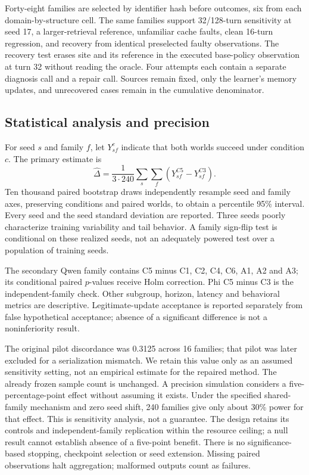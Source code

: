 \documentclass{svproc}
\begin{document}
Forty-eight families are selected by identifier hash before outcomes, six from
each domain-by-structure cell. The same families support 32/128-turn sensitivity
at seed 17, a larger-retrieval reference, unfamiliar cache faults, clean 16-turn
regression, and recovery from identical preselected faulty observations.
The recovery test erases site and its reference in the executed base-policy
observation at turn 32 without reading the oracle. Four attempts each contain a
separate diagnosis call and a repair call. Sources remain fixed, only the learner's
memory updates, and unrecovered cases remain in the cumulative denominator.

\subsection{Statistical analysis and precision}
For seed $s$ and family $f$, let $Y_{sf}^{c}$ indicate that both worlds succeed
under condition $c$. The primary estimate is
\[
 \widehat\Delta=\frac{1}{3\cdot240}\sum_s\sum_f
 (Y_{sf}^{C5}-Y_{sf}^{C3}).
\]
Ten thousand paired bootstrap draws independently resample seed and family axes,
preserving conditions and paired worlds, to obtain a percentile 95\% interval.
Every seed and the seed standard deviation are reported. Three seeds poorly
characterize training variability and tail behavior. A family sign-flip test is
conditional on these realized seeds, not an adequately powered test over a
population of training seeds.

The secondary Qwen family contains C5 minus C1, C2, C4, C6, A1, A2 and A3;
its conditional paired $p$-values receive Holm correction. Phi C5 minus C3 is
the independent-family check. Other subgroup, horizon, latency and behavioral
metrics are descriptive. Legitimate-update acceptance is reported separately
from false hypothetical acceptance; absence of a significant difference is not
a noninferiority result.

The original pilot discordance was 0.3125 across 16 families; that pilot was
later excluded for a serialization mismatch. We retain this value only as an
assumed sensitivity setting, not an empirical estimate for the repaired method.
The already frozen sample count is unchanged. A precision simulation considers
a five-percentage-point effect without assuming it exists. Under the specified
shared-family mechanism and zero seed shift, 240 families give only about 30\%
power for that effect. This is sensitivity analysis, not a guarantee. The design
retains its controls and independent-family replication within the resource ceiling;
a null result cannot establish absence of a five-point benefit. There is no
significance-based stopping, checkpoint selection or seed extension. Missing
paired observations halt aggregation; malformed outputs count as failures.
\end{document}
